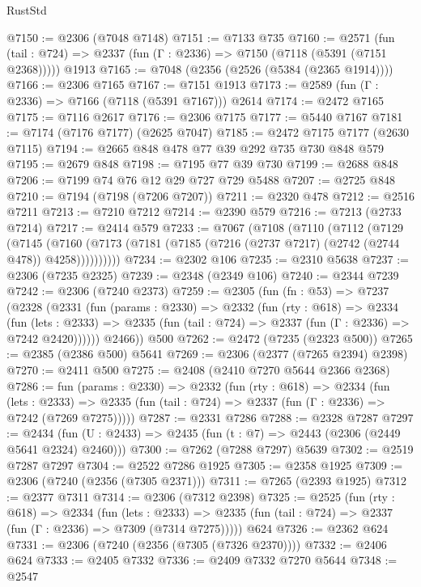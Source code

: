 \begin{lexlean}{RustStd}
\begin{coremodule}
@7150 := @2306 (@7048 @7148)
@7151 := @7133 @735
@7160 := @2571
    (fun (tail : @724) => @2337 (fun (Γ : @2336) => @7150 (@7118 (@5391 (@7151 @2368)))))
    @1913
@7165 := @7048 (@2356 (@2526 (@5384 (@2365 @1914))))
@7166 := @2306 @7165
@7167 := @7151 @1913
@7173 := @2589 (fun (Γ : @2336) => @7166 (@7118 (@5391 @7167))) @2614
@7174 := @2472 @7165
@7175 := @7116 @2617
@7176 := @2306 @7175
@7177 := @5440 @7167
@7181 := @7174 (@7176 @7177) (@2625 @7047)
@7185 := @2472 @7175 @7177 (@2630 @7115)
@7194 := @2665 @848 @478 @77 @39 @292 @735 @730 @848 @579
@7195 := @2679 @848
@7198 := @7195 @77 @39 @730
@7199 := @2688 @848
@7206 := @7199 @74 @76 @12 @29 @727 @729 @5488
@7207 := @2725 @848
@7210 := @7194 (@7198 (@7206 @7207))
@7211 := @2320 @478
@7212 := @2516 @7211
@7213 := @7210 @7212
@7214 := @2390 @579
@7216 := @7213 (@2733 @7214)
@7217 := @2414 @579
@7233 := @7067
    (@7108
      (@7110
        (@7112
          (@7129
            (@7145
              (@7160 (@7173 (@7181 (@7185 (@7216 (@2737 @7217) (@2742 (@2744 @478)) @4258))))))))))
@7234 := @2302 @106
@7235 := @2310 @5638
@7237 := @2306 (@7235 @2325)
@7239 := @2348 (@2349 @106)
@7240 := @2344 @7239
@7242 := @2306 (@7240 @2373)
@7259 := @2305
    (fun (fn : @53) =>
    @7237
      (@2328
        (@2331
          (fun (params : @2330) =>
          @2332
            (fun (rty : @618) =>
            @2334
              (fun (lets : @2333) =>
              @2335 (fun (tail : @724) => @2337 (fun (Γ : @2336) => @7242 @2420))))))
        @2466))
    @500
@7262 := @2472 (@7235 (@2323 @500))
@7265 := @2385 (@2386 @500) @5641
@7269 := @2306 (@2377 (@7265 @2394) @2398)
@7270 := @2411 @500
@7275 := @2408 (@2410 @7270 @5644 @2366 @2368)
@7286 := fun (params : @2330) =>
  @2332
    (fun (rty : @618) =>
    @2334
      (fun (lets : @2333) =>
      @2335 (fun (tail : @724) => @2337 (fun (Γ : @2336) => @7242 (@7269 @7275)))))
@7287 := @2331 @7286
@7288 := @2328 @7287
@7297 := @2434 (fun (U : @2433) => @2435 (fun (t : @7) => @2443 (@2306 (@2449 @5641 @2324) @2460)))
@7300 := @7262 (@7288 @7297) @5639
@7302 := @2519 @7287 @7297
@7304 := @2522 @7286 @1925
@7305 := @2358 @1925
@7309 := @2306 (@7240 (@2356 (@7305 @2371)))
@7311 := @7265 (@2393 @1925)
@7312 := @2377 @7311
@7314 := @2306 (@7312 @2398)
@7325 := @2525
    (fun (rty : @618) =>
    @2334
      (fun (lets : @2333) =>
      @2335 (fun (tail : @724) => @2337 (fun (Γ : @2336) => @7309 (@7314 @7275)))))
    @624
@7326 := @2362 @624
@7331 := @2306 (@7240 (@2356 (@7305 (@7326 @2370))))
@7332 := @2406 @624
@7333 := @2405 @7332
@7336 := @2409 @7332 @7270 @5644
@7348 := @2547

\end{coremodule}
\end{lexlean}
